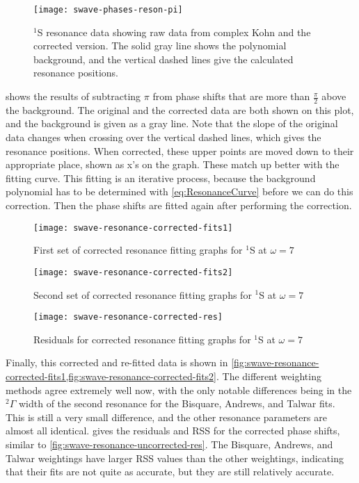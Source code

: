 \documentclass[Dissertation.tex]{subfiles}
\begin{document}
\begin{figure}[H]
	\centering
	\texttt{[image: swave-phases-reson-pi]}
	\caption[$^1$S resonance data showing correction]{$^1$S resonance data showing raw data from complex Kohn and the corrected version. The solid gray line shows the polynomial background, and the vertical dashed lines give the calculated resonance positions.}
	\label{fig:swave-phases-reson-pi}
\end{figure}

 shows the results of subtracting $\pi$ from 
phase shifts that are more than $\frac{\pi}{2}$ above the background. The 
original and the corrected data are both shown on this plot, and the 
background is given as a gray line. Note that the slope of the original data 
changes when crossing over the vertical dashed lines, which gives the 
resonance positions. When corrected, these upper points are moved down to 
their appropriate place, shown as x's on the graph. These match up better 
with the fitting curve. This fitting is an iterative process, because the 
background polynomial has to be determined with \cref{eq:ResonanceCurve} 
before we can do this correction. Then the phase shifts are fitted again 
after performing the correction.

\begin{figure}[H]
	\centering
	\texttt{[image: swave-resonance-corrected-fits1]}
	\caption{First set of corrected resonance fitting graphs for $^1$S at $\omega = 7$}
	\label{fig:swave-resonance-corrected-fits1}
\end{figure}

\begin{figure}[H]
	\centering
	\texttt{[image: swave-resonance-corrected-fits2]}
	\caption{Second set of corrected resonance fitting graphs for $^1$S at $\omega = 7$}
	\label{fig:swave-resonance-corrected-fits2}
\end{figure}

\begin{figure}[H]
	\centering
	\texttt{[image: swave-resonance-corrected-res]}
	\caption{Residuals for corrected resonance fitting graphs for $^1$S at $\omega = 7$}
	\label{fig:swave-resonance-corrected-res}
\end{figure}

Finally, this corrected and re-fitted data is shown in
\cref{fig:swave-resonance-corrected-fits1,fig:swave-resonance-corrected-fits2}. The different 
weighting methods agree extremely well now, with the only notable differences 
being in the $^2\Gamma$ width of the second resonance for the Bisquare, 
Andrews, and Talwar fits. This is still a very small difference, and the 
other resonance parameters are almost all identical.
 gives the residuals and RSS for the corrected phase
shifts, similar to \cref{fig:swave-resonance-uncorrected-res}. The Bisquare, Andrews, 
and Talwar weightings have larger RSS values than the other weightings, 
indicating that their fits are not quite as accurate, but they are still 
relatively accurate.
\end{document}
